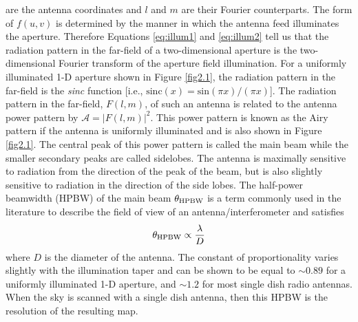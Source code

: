 are the antenna coordinates and $l$ and $m$ are their Fourier counterparts. The form of $f(u,v)$ is determined by the manner in which the antenna feed illuminates the aperture. Therefore Equations \ref{eq:illum1} and \ref{eq:illum2} tell us that the radiation pattern in the far-field of a two-dimensional aperture is the two-dimensional Fourier transform of the aperture field illumination. For a uniformly illuminated 1-D aperture shown in Figure \ref{fig2.1}, the radiation pattern in the far-field is the \textit{sinc} function [i.e., $\mathrm{sinc}(x)=\mathrm{sin}(\pi x)/(\pi x)$]. The radiation pattern in the far-field, $F(l,m)$, of such an antenna is related to the antenna power pattern by $\mathcal{A}=|F(l,m)|^2$. This power pattern is known as the Airy pattern if the antenna is uniformly illuminated and is also shown in Figure \ref{fig2.1}. The central peak of this power pattern is called the main beam while the smaller secondary peaks are called sidelobes. The antenna is maximally sensitive to radiation from the direction of the peak of the beam, but is also slightly sensitive to radiation in the direction of the side lobes. The half-power beamwidth (HPBW) of the main beam $\theta_{\rm{HPBW}}$ is a term commonly used in the literature to describe the field of view of an antenna/interferometer and satisfies 
\begin{equation}
\theta_{\rm{HPBW}} \propto \frac{\lambda}{D}
\end{equation}
where $D$ is the diameter of the antenna. The constant of proportionality varies slightly with the illumination taper and can be shown to be equal to $\sim 0.89$ for a uniformly illuminated 1-D aperture, and $\sim 1.2$ for most single dish radio antennas. When the sky is scanned with a single dish antenna, then this HPBW is the resolution of the resulting map. 
